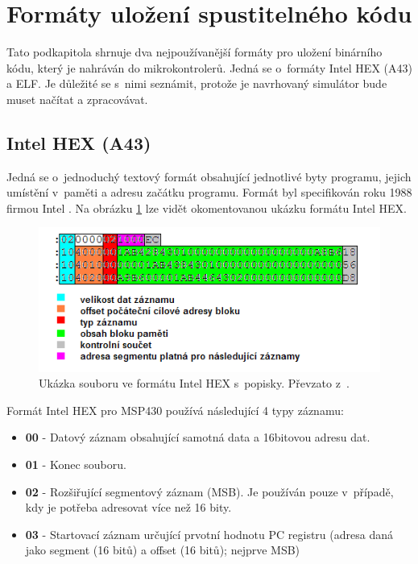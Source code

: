 \section{Formáty uložení spustitelného kódu}

Tato podkapitola shrnuje dva nejpoužívanější formáty pro uložení binárního kódu, který je nahráván do mikrokontrolerů. Jedná se o~formáty Intel HEX (A43) a ELF. Je důležité se s~nimi seznámit, protože je navrhovaný simulátor bude muset načítat a zpracovávat.

\subsection{Intel HEX (A43)}

Jedná se o~jednoduchý textový formát obsahující jednotlivé byty programu, jejich umístění v~paměti a adresu začátku programu. Formát byl specifikován roku 1988 firmou Intel \cite{intelhex}. Na obrázku \ref{fig:intelhex} lze vidět okomentovanou ukázku formátu Intel HEX.

\begin{figure}[ht]
\centering
\includegraphics[trim=0cm 0cm 0cm 0cm, scale=0.7]{fig/intelhex}
\caption{Ukázka souboru ve formátu Intel HEX s~popisky. Převzato z~\cite{intelhex2}.}
\label{fig:intelhex}
\end{figure}

Formát Intel HEX pro MSP430 používá následující 4 typy záznamu:

\begin{itemize}
\item \textbf{00} - Datový záznam obsahující samotná data a 16bitovou adresu dat.
\item \textbf{01} - Konec souboru.
\item \textbf{02} - Rozšiřující segmentový záznam (MSB). Je používán pouze v~případě, kdy je potřeba adresovat více než 16 bity.
\item \textbf{03} - Startovací záznam určující prvotní hodnotu PC registru (adresa daná jako segment (16 bitů) a offset (16 bitů); nejprve MSB)
\end{itemize}

